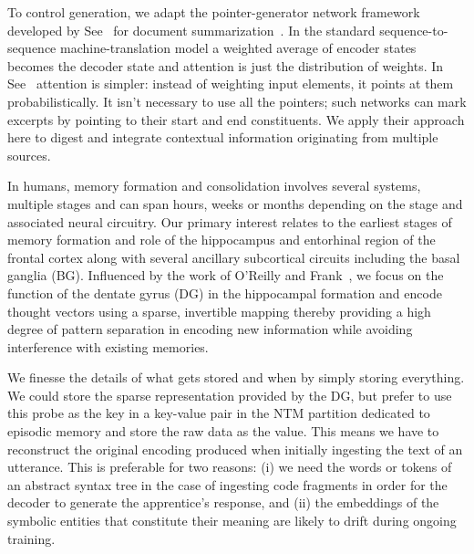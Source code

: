 To control generation, we adapt the pointer-generator network framework developed by See~\etal{} for document summarization~\cite{SeeetalACL-17}. In the standard sequence-to-sequence machine-translation model a weighted average of encoder states becomes the decoder state and attention is just the distribution of weights. In See~\etal{} attention is simpler: instead of weighting input elements, it points at them probabilistically. It isn't necessary to use all the pointers; such networks can mark excerpts by pointing to their start and end constituents. We apply their approach here to digest and integrate contextual information originating from multiple sources.

In humans, memory formation and consolidation involves several systems, multiple stages and can span hours, weeks or months depending on the stage and associated neural circuitry. Our primary interest relates to the earliest stages of memory formation and role of the hippocampus and entorhinal region of the frontal cortex along with several ancillary subcortical circuits including the basal ganglia (BG). Influenced by the work of O'Reilly and Frank{}~\cite{OReillyandFrankNC-06}, we focus on the function of the dentate gyrus (DG) in the hippocampal formation and encode thought vectors using a sparse, invertible mapping thereby providing a high degree of pattern separation in encoding new information while avoiding interference with existing memories. 

We finesse the details of what gets stored and when by simply storing everything. We could store the sparse representation provided by the DG, but prefer to use this probe as the key in a key-value pair in the NTM partition dedicated to episodic memory and store the raw data as the value. This means we have to reconstruct the original encoding produced when initially ingesting the text of an utterance. This is preferable for two reasons: (i) we need the words \emdash{} or tokens of an abstract syntax tree in the case of ingesting code fragments \emdash{} in order for the decoder to generate the apprentice's response, and (ii) the embeddings of the symbolic entities that constitute their meaning are likely to drift during ongoing training.

